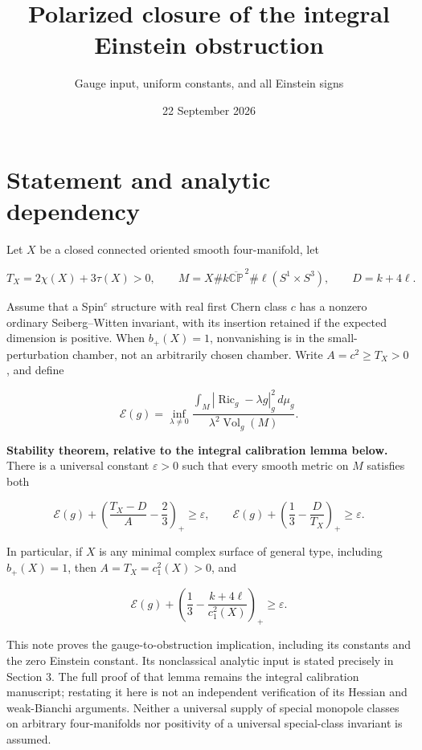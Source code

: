 \documentclass[
  11pt,
]{article}
\title{Polarized closure of the integral Einstein obstruction}
\subtitle{Gauge input, uniform constants, and all Einstein signs}
\author{}
\date{22 September 2026}
\begin{document}
\maketitle

\hypertarget{statement-and-analytic-dependency}{%
\section{Statement and analytic
dependency}\label{statement-and-analytic-dependency}}

Let \(X\) be a closed connected oriented smooth four-manifold, let

\[
T_X=2\chi(X)+3\tau(X)>0,
\qquad M=X\#k\overline{\mathbb{CP}}^{\,2}
                 \#\ell(S^1\times S^3),\qquad D=k+4\ell.
\]

Assume that a Spin\(^c\) structure with real first Chern class \(c\) has
a nonzero ordinary Seiberg--Witten invariant, with its insertion
retained if the expected dimension is positive. When \(b_+(X)=1\),
nonvanishing is in the small-perturbation chamber, not an arbitrarily
chosen chamber. Write \(A=c^2\ge T_X>0\), and define

\[
\mathcal E(g)=\inf_{\lambda\ne0}
 \frac{\int_M|\operatorname{Ric}_g-\lambda g|_g^2\,d\mu_g}
 {\lambda^2\operatorname{Vol}_g(M)}.
\]

\textbf{Stability theorem, relative to the integral calibration lemma
below.} There is a universal constant \(\varepsilon>0\) such that every
smooth metric on \(M\) satisfies both

\[
\mathcal E(g)+\left(\frac{T_X-D}{A}-\frac23\right)_+
 \ge\varepsilon,
\qquad
\mathcal E(g)+\left(\frac13-\frac D{T_X}\right)_+
 \ge\varepsilon.                                      \tag{1}
\]

In particular, if \(X\) is any minimal complex surface of general type,
including \(b_+(X)=1\), then \(A=T_X=c_1^2(X)>0\), and

\[
\boxed{\mathcal E(g)+
 \left(\frac13-\frac{k+4\ell}{c_1^2(X)}\right)_+
 \ge\varepsilon.}                                    \tag{2}
\]

This note proves the gauge-to-obstruction implication, including its
constants and the zero Einstein constant. Its nonclassical analytic
input is stated precisely in Section 3. The full proof of that lemma
remains the integral calibration manuscript; restating it here is not an
independent verification of its Hessian and weak-Bianchi arguments.
Neither a universal supply of special monopole classes on arbitrary
four-manifolds nor positivity of a universal special-class invariant is
assumed.
\end{document}
